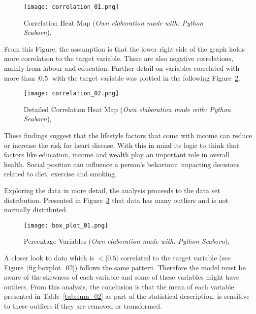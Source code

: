 \documentclass[
10pt, %
a4paper, %
oneside, %
headinclude,footinclude, %
BCOR5mm, %
]{scrartcl}
\begin{document}
\FloatBarrier
\begin{figure}[H]
\centering 
\texttt{[image: correlation\_01.png]} 
\caption[Correlation Heat Map]{Correlation Heat Map (\emph{Own elaboration made with: Python Seaborn}), }
\label{fig:correlation_01} 
\end{figure}

From this Figure, the assumption is that the lower right side of the graph holds more correlation to the target variable. There are also negative correlations, mainly from labour and education. Further detail on variables correlated with more than $|0.5|$ with the target variable was plotted in the following Figure~\ref{fig:correlation_02}.

\FloatBarrier
\begin{figure}[H]
\centering 
\texttt{[image: correlation\_02.png]} 
\caption[Detailed Correlation Heat Map]{Detailed Correlation Heat Map (\emph{Own elaboration made with: Python Seaborn}), }
\label{fig:correlation_02} 
\end{figure}

These findings suggest that the lifestyle factors that come with income can reduce or increase the risk for heart disease. With this in mind its logic to think that factors like education, income and wealth play an important role in overall health. Social position can influence a person’s behaviour, impacting decisions related to diet, exercise and smoking.

Exploring the data in more detail, the analysis proceeds to the data set distribution. Presented in Figure~\ref{fig:boxplot_01} that data has many outliers and is not normally distributed.

\FloatBarrier
\begin{figure}[H]
\centering 
\texttt{[image: box\_plot\_01.png]} 
\caption[Box plot of data variables]{Percentage Variables (\emph{Own elaboration made with: Python Seaborn}), }
\label{fig:boxplot_01} 
\end{figure}

A closer look to data which is $<|0.5|$ correlated to the target variable (see Figure~\ref{fig:boxplot_02}) follows the same pattern. Therefore the model must be aware of the skewness of each variable and some of these variables might have outliers. From this analysis, the conclusion is that the mean of each variable presented in Table~\ref{tab:sum_02} as part of the statistical description, is sensitive to these outliers if they are removed or transformed.
\end{document}
